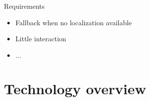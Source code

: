 \documentclass[11pt]{beamer}
\begin{document}
\begin{frame}{Requirements}

    \begin{itemize}
    
    	\item Fallback when no localization available
    	\item Little interaction
    	\item ...
    
    \end{itemize}

\end{frame}

\section{Technology overview}
\end{document}
